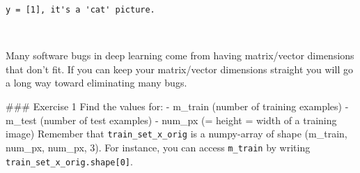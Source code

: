 \documentclass[11pt]{article}
\begin{document}
    \begin{Verbatim}[commandchars=\\\{\}]
y = [1], it's a 'cat' picture.
    \end{Verbatim}

    \begin{center}
    \end{center}
    { \hspace*{\fill} \\}
    
    Many software bugs in deep learning come from having matrix/vector
dimensions that don't fit. If you can keep your matrix/vector dimensions
straight you will go a long way toward eliminating many bugs.

\#\#\# Exercise 1 Find the values for: - m\_train (number of training
examples) - m\_test (number of test examples) - num\_px (= height =
width of a training image) Remember that \texttt{train\_set\_x\_orig} is
a numpy-array of shape (m\_train, num\_px, num\_px, 3). For instance,
you can access \texttt{m\_train} by writing
\texttt{train\_set\_x\_orig.shape{[}0{]}}.
\end{document}
